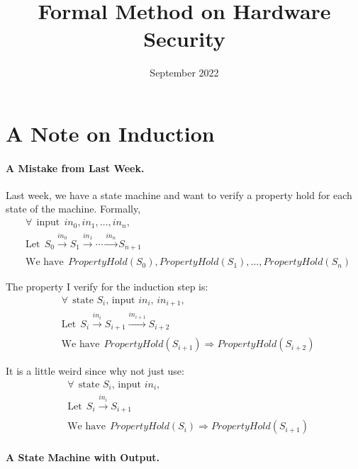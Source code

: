 \documentclass{article}
\title{Formal Method on Hardware Security}
\author{}
\date{September 2022}
\begin{document}
\maketitle










\section{A Note on Induction}


\paragraph{A Mistake from Last Week.}
Last week, we have a state machine and want to verify a property hold for each state of the machine.
Formally,
\begin{align*}
& \forall ~~ \text{input} ~~ in_0, in_1, \dots, in_n, \\
& \text{Let} ~~ S_0 \xrightarrow[]{in_0} S_{1} \xrightarrow[]{in_1} \cdots \xrightarrow[]{in_n} S_{n+1} \\
& \text{We have} ~~ PropertyHold(S_0), PropertyHold(S_1), \dots, PropertyHold(S_n)
\end{align*}

The property I verify for the induction step is:
\begin{align*}
& \forall ~~ \text{state $S_i$, input $in_i$, $in_{i+1}$}, \\
& \text{Let} ~~ S_i \xrightarrow[]{in_i} S_{i+1} \xrightarrow[]{in_{i+1}} S_{i+2} \\
& \text{We have} ~~ PropertyHold(S_{i+1}) \Rightarrow PropertyHold(S_{i+2})
\end{align*}

It is a little weird since why not just use:
\begin{align*}
& \forall ~~ \text{state $S_i$, input $in_i$}, \\
& \text{Let} ~~ S_i \xrightarrow[]{in_i} S_{i+1} \\
& \text{We have} ~~ PropertyHold(S_{i}) \Rightarrow PropertyHold(S_{i+1})
\end{align*}




\paragraph{A State Machine with Output.}
\end{document}
